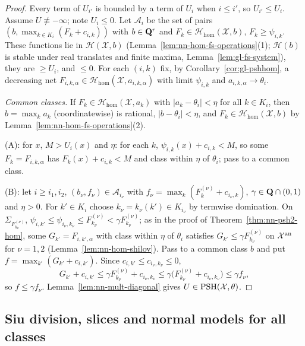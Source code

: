 \begin{proof}
Every term of $U_{i'}$ is bounded by a term of $U_i$ when $i\le i'$, so $U_{i'}\le U_i$. Assume $U\not\equiv-\infty$; note $U_i\le0$. Let $\mathcal A_i$ be the
set of pairs $(b,\max_{k\in K_i}(F_k+c_{i,k}))$ with $b\in\mathbf{Q}^r$ and $F_k\in\mathcal H_{\mathrm{hom}}(\mathcal X,b)$, $F_k\ge\psi_{i,k}$. These functions lie in
$\mathcal H(\mathcal X,b)$ (Lemma~\ref{lem:nn-hom-fs-operations}(1); $\mathcal H(b)$ is stable under real translates and finite maxima,
Lemma~\ref{lem:gl-fs-system}), they are $\ge U_i$, and $\le0$. For each $(i,k)$ fix, by Corollary~\ref{cor:gl-pshhom}, a decreasing net
$F_{i,k,\alpha}\in\mathcal H_{\mathrm{hom}}(\mathcal X,a_{i,k,\alpha})$ with limit $\psi_{i,k}$ and $a_{i,k,\alpha}\to\theta_i$.

\emph{Common classes.} If $F_k\in\mathcal H_{\mathrm{hom}}(\mathcal X,a_k)$ with $|a_k-\theta_i|<\eta$ for all $k\in K_i$, then $b=\max_ka_k$ (coordinatewise) is rational,
$|b-\theta_i|<\eta$, and $F_k\in\mathcal H_{\mathrm{hom}}(\mathcal X,b)$ by Lemma~\ref{lem:nn-hom-fs-operations}(2).

(A): for $x$, $M>U_i(x)$ and $\eta$: for each $k$, $\psi_{i,k}(x)+c_{i,k}<M$, so some $F_k=F_{i,k,\alpha}$ has $F_k(x)+c_{i,k}<M$ and class within $\eta$ of
$\theta_i$; pass to a common class.

(B): let $i\ge i_1,i_2$, $(b_\nu,f_\nu)\in\mathcal A_{i_\nu}$ with $f_\nu=\max_k(F^{(\nu)}_k+c_{i_\nu,k})$, $\gamma\in\mathbf{Q}\cap(0,1)$ and $\eta>0$. For $k'\in K_i$ choose
$k_\nu=k_\nu(k')\in K_{i_\nu}$ by termwise domination. On $\Sigma_{F^{(\nu)}_{k_\nu}}$, $\psi_{i,k'}\le\psi_{i_\nu,k_\nu}\le F^{(\nu)}_{k_\nu}<\gamma F^{(\nu)}_{k_\nu}$; as in the
proof of Theorem~\ref{thm:nn-psh2-hom}, some $G_{k'}=F_{i,k',\alpha}$ with class within $\eta$ of $\theta_i$ satisfies $G_{k'}\le\gamma F^{(\nu)}_{k_\nu}$ on $\mathcal X^{\mathrm{an}}$
for $\nu=1,2$ (Lemma~\ref{lem:nn-hom-shilov}). Pass to a common class $b$ and put $f=\max_{k'}(G_{k'}+c_{i,k'})$. Since $c_{i,k'}\le c_{i_\nu,k_\nu}\le0$,
\[
G_{k'}+c_{i,k'}\le\gamma F^{(\nu)}_{k_\nu}+c_{i_\nu,k_\nu}\le\gamma\bigl(F^{(\nu)}_{k_\nu}+c_{i_\nu,k_\nu}\bigr)\le\gamma f_\nu,
\]
so $f\le\gamma f_\nu$. Lemma~\ref{lem:nn-mult-diagonal} gives $U\in\operatorname{PSH}(\mathcal X,\theta)$.
\end{proof}

\subsection{Siu division, slices and normal models for all classes}\label{subsec:nn-normal}

